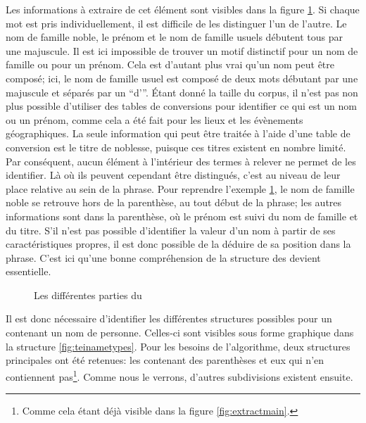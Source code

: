 Les informations à extraire de cet élément sont visibles dans la figure \ref{code:prepin_teiname_part}. Si chaque mot est pris individuellement, il est difficile de les distinguer l'un de l'autre. Le nom de famille noble, le prénom et le nom de famille usuels débutent tous par une majuscule. Il est ici impossible de trouver un motif distinctif pour un nom de famille ou pour un prénom. Cela est d'autant plus vrai qu'un nom peut être composé; ici, le nom de famille usuel est composé de deux mots débutant par une majuscule et séparés par un \enquote{d'}. Étant donné la taille du corpus, il n'est pas non plus possible d'utiliser des tables de conversions pour identifier ce qui est un nom ou un prénom, comme cela a été fait pour les lieux et les évènements géographiques. La seule information qui peut être traitée à l'aide d'une table de conversion est le titre de noblesse, puisque ces titres existent en nombre limité. Par conséquent, aucun élément à l'intérieur des termes à relever ne permet de les identifier. Là où ils peuvent cependant être distingués, c'est au niveau de leur place relative au sein de la phrase. Pour reprendre l'exemple \ref{code:prepin_teiname_part}, le nom de famille noble se retrouve hors de la parenthèse, au tout début de la phrase; les autres informations sont dans la parenthèse, où le prénom est suivi du nom de famille et du titre. S'il n'est pas possible d'identifier la valeur d'un nom à partir de ses caractéristiques propres, il est donc possible de la déduire de sa position dans la phrase. C'est ici qu'une bonne compréhension de la structure des \tname{} devient essentielle.

\begin{figure}[h!]
	\centering
	\caption{Les différentes parties du \tname}
	\label{code:prepin_teiname_part}
\end{figure}

Il est donc nécessaire d'identifier les différentes structures possibles pour un \tname{} contenant un nom de personne. Celles-ci sont visibles sous forme graphique dans la structure \ref{fig:teinametypes}. Pour les besoins de l'algorithme, deux structures principales ont été retenues: les \tname{} contenant des parenthèses et eux qui n'en contiennent pas\footnote{Comme cela étant déjà visible dans la figure \ref{fig:extractmain}.}. Comme nous le verrons, d'autres subdivisions existent ensuite.

